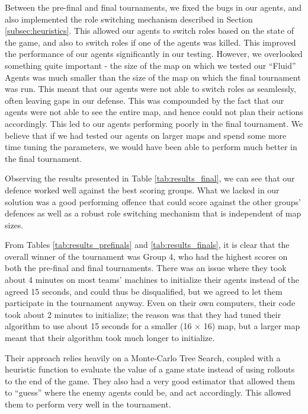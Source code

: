 \documentclass[a4paper,12pt]{article}
\begin{document}
Between the pre-final and final tournaments, we fixed the bugs in our agents, and also implemented the role switching mechanism described in Section \ref{subsec:heuristics}. This allowed our agents to switch roles based on the state of the game, and also to switch roles if one of the agents was killed. This improved the performance of our agents significantly in our testing. However, we overlooked something quite important - the size of the map on which we tested our ``Fluid'' Agents was much smaller than the size of the map on which the final tournament was run. This meant that our agents were not able to switch roles as seamlessly, often leaving gaps in our defense. This was compounded by the fact that our agents were not able to see the entire map, and hence could not plan their actions accordingly. This led to our agents performing poorly in the final tournament. We believe that if we had tested our agents on larger maps and spend some more time tuning the parameters, we would have been able to perform much better in the final tournament.


Observing the results presented in Table \ref{tab:results_final}, we can see that our defence worked well against the best scoring groups. What we lacked in our solution was a good performing offence that could score against the other groups' defences as well as a robust role switching mechanism that is independent of map sizes.


From Tables \ref{tab:results_prefinals} and \ref{tab:results_finals}, it is clear that the overall winner of the tournament was Group 4, who had the highest scores on both the pre-final and final tournaments. 
There was an issue where they took about 4 minutes on most teams' machines to initialize their agents instead of the agreed 15 seconds, and could thus be disqualified, but we agreed to let them participate in the tournament anyway. Even on their own computers, their code took about 2 minutes to initialize; the reason was that they had tuned their algorithm to use about 15 seconds for a smaller (16 $\times$ 16) map, but a larger map meant that their algorithm took much longer to initialize.

Their approach relies heavily on a Monte-Carlo Tree Search, coupled with a heuristic function to evaluate the value of a game state instead of using rollouts to the end of the game. 
They also had a very good estimator that allowed them to ``guess'' where the enemy agents could be, and act accordingly. This allowed them to perform very well in the tournament.
\end{document}

